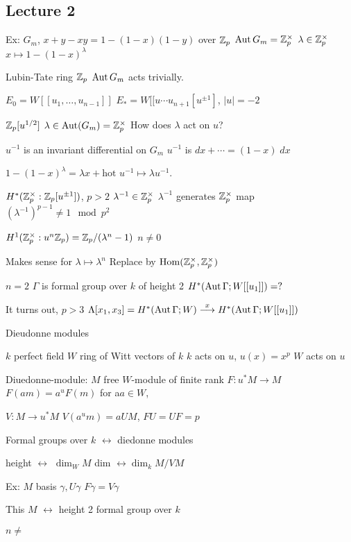 \newpage
\subsection{Lecture 2}

Ex: $G_m$,
$x+y-xy= 1 - (1-x)(1-y)$
over $\mathbb{Z}_p$
$\operatorname{Aut} G_m= \mathbb{Z}_p^\times$
$\lambda \in \mathbb{Z}_p^\times$
$x \mapsto 1 - (1-x)^\lambda$

Lubin-Tate ring $\mathbb{Z}_p$
$\operatorname{Aut} G_m$ acts trivially.

$E_0= W[[u_1,\ldots,u_{n-1}]]$
$E_*= W[[u\cdots u_{n+1}[u^{\pm 1}]$, $|u|= -2$

$\mathbb{Z}_p[u^{1/2}]$
$\lambda \in \operatorname{Aut}(G_m)= \mathbb{Z}_p^\times$
How does $\lambda$ act on $u$?

$u^{-1}$ is an invariant differential on $G_m$
$u^{-1}$ is $dx+ \cdots= (1-x)\;dx$

$1-(1-x)^\lambda= \lambda x + \text{hot}$
$u^{-1} \mapsto \lambda u^{-1}$. 

$H^*(\mathbb{Z}_p^\times: \mathbb{Z}_p[u^{\pm 1}])$, $p>2$
$\lambda^{-1} \in \mathbb{Z}_p^\times$
$\lambda^{-1}$ generates $\mathbb{Z}_p^\times$ map 
$(\lambda^{-1})^{p-1} \neq 1 \mod p^2$

$H^1(\mathbb{Z}_p^\times : u^n \mathbb{Z}_p)= \mathbb{Z}_p/(\lambda^n-1)$
$n \neq 0$

Makes sense for $\lambda \mapsto \lambda^n$
Replace by $\operatorname{Hom}(\mathbb{Z}_p^\times,\mathbb{Z}_p^\times)$


$n=2$ 
$\Gamma$ is formal group over $k$ of height 2
$H^*(\operatorname{Aut} \Gamma; W[[u_1]])=?$

It turns out, $p>3$
$\Lambda[x_1,x_3]=H^*(\operatorname{Aut} \Gamma; W) \stackrel{x}{\longrightarrow} H^*(\operatorname{Aut} \Gamma; W[[u_1]])$


Dieudonne modules

$k$ perfect field
$W$ ring of Witt vectors of $k$
$k$ acts on $u$, $u(x)= x^p$
$W$ acts on $u$

Diuedonne-module:
$M$ free $W$-module of finite rank
$F: u^*M \to M$
$F(am)= a^u F(m)$ for a$a \in W$,

$V: M \to u^*M$
$V(a^um)= aUM$,
$FU=UF=p$

Formal groups over $k$ $\leftrightarrow$ diedonne modules

height $\leftrightarrow$ $\dim_W M$
dim $\leftrightarrow \dim_k M/VM$



Ex: $M$ basis $\gamma, U\gamma$
$F\gamma= V \gamma$

This $M$ $\leftrightarrow$ height 2 formal group over $k$


$n \neq $

